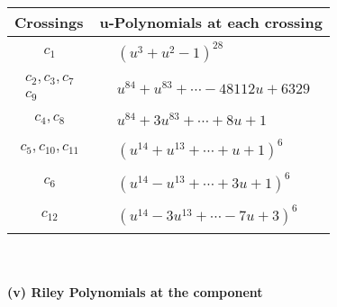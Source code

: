 \documentclass[1p]{elsarticle_modified}
\theoremstyle{definition}
\begin{document}
\begin{tabular}{m{50pt}|m{274pt}}
Crossings & \hspace{64pt}u-Polynomials at each crossing \\
\hline $$\begin{aligned}c_{1}\end{aligned}$$&$\begin{aligned}
&(u^3+u^2-1)^{28}
\end{aligned}$\\
\hline $$\begin{aligned}c_{2},c_{3},c_{7}\\c_{9}\end{aligned}$$&$\begin{aligned}
&u^{84}+u^{83}+\cdots-48112 u+6329
\end{aligned}$\\
\hline $$\begin{aligned}c_{4},c_{8}\end{aligned}$$&$\begin{aligned}
&u^{84}+3 u^{83}+\cdots+8 u+1
\end{aligned}$\\
\hline $$\begin{aligned}c_{5},c_{10},c_{11}\end{aligned}$$&$\begin{aligned}
&(u^{14}+u^{13}+\cdots+u+1)^{6}
\end{aligned}$\\
\hline $$\begin{aligned}c_{6}\end{aligned}$$&$\begin{aligned}
&(u^{14}- u^{13}+\cdots+3 u+1)^{6}
\end{aligned}$\\
\hline $$\begin{aligned}c_{12}\end{aligned}$$&$\begin{aligned}
&(u^{14}-3 u^{13}+\cdots-7 u+3)^{6}
\end{aligned}$\\
\hline
\end{tabular}\\~\\
\newpage\renewcommand{\arraystretch}{1}
\flushleft \textbf{(v) Riley Polynomials at the component}\newline \\
\end{document}

